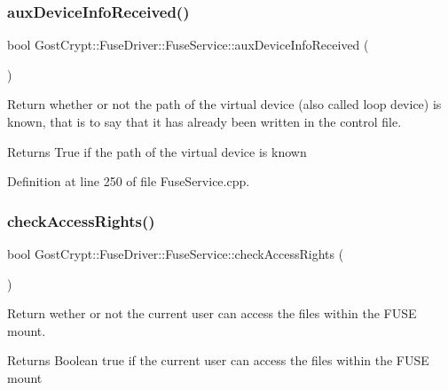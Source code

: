 \subsubsection{\texorpdfstring{aux\+Device\+Info\+Received()}{auxDeviceInfoReceived()}}
{\footnotesize\ttfamily bool Gost\+Crypt\+::\+Fuse\+Driver\+::\+Fuse\+Service\+::aux\+Device\+Info\+Received (\begin{DoxyParamCaption}{ }\end{DoxyParamCaption})\hspace{0.3cm}{\ttfamily [static]}}



Return whether or not the path of the virtual device (also called loop device) is known, that is to say that it has already been written in the control file. 

\begin{DoxyReturn}{Returns}
True if the path of the virtual device is known 
\end{DoxyReturn}


Definition at line 250 of file Fuse\+Service.\+cpp.

\mbox{\label{class_gost_crypt_1_1_fuse_driver_1_1_fuse_service_af6d74b87def44e650978fe446d4d1593}} 
\subsubsection{\texorpdfstring{check\+Access\+Rights()}{checkAccessRights()}}
{\footnotesize\ttfamily bool Gost\+Crypt\+::\+Fuse\+Driver\+::\+Fuse\+Service\+::check\+Access\+Rights (\begin{DoxyParamCaption}{ }\end{DoxyParamCaption})\hspace{0.3cm}{\ttfamily [static]}}



Return wether or not the current user can access the files within the F\+U\+SE mount. 

\begin{DoxyReturn}{Returns}
Boolean true if the current user can access the files within the F\+U\+SE mount 
\end{DoxyReturn}


